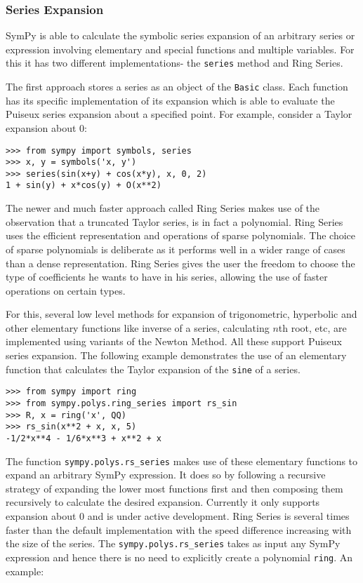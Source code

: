 \subsubsection{Series Expansion}

SymPy is able to calculate the symbolic series expansion of an arbitrary series
or expression involving elementary and special functions and multiple
variables. For this it has two different implementations- the \texttt{series}
method and Ring Series.

The first approach stores a series as an object of the \texttt{Basic} class.
Each function has its specific implementation of its expansion which is able to
evaluate the Puiseux series expansion about a specified point. For example,
consider a Taylor expansion about 0:

\begin{verbatim}
>>> from sympy import symbols, series
>>> x, y = symbols('x, y')
>>> series(sin(x+y) + cos(x*y), x, 0, 2)
1 + sin(y) + x*cos(y) + O(x**2)
\end{verbatim}

The newer and much faster approach called Ring Series makes use of the
observation that a truncated Taylor series, is in fact a polynomial.
Ring Series uses the efficient representation and operations of sparse
polynomials. The choice of sparse polynomials is deliberate as it performs
well in a wider range of cases than a dense representation. Ring Series gives 
the user the freedom to choose the type of coefficients he wants to have in
his series, allowing the use of faster operations on certain types.

For this, several low level methods for expansion of trigonometric, hyperbolic
and other elementary functions like inverse of a series, calculating $n$th
root, etc, are implemented using variants of the Newton\cite{zimmerman} Method.
All these support Puiseux series expansion. The following example demonstrates
the use of an elementary function that calculates the Taylor expansion of the
\texttt{sine} of a series.

\begin{verbatim}
>>> from sympy import ring
>>> from sympy.polys.ring_series import rs_sin
>>> R, x = ring('x', QQ)
>>> rs_sin(x**2 + x, x, 5)
-1/2*x**4 - 1/6*x**3 + x**2 + x
\end{verbatim}

The function \texttt{sympy.polys.rs\_series} makes use of these elementary
functions to expand an arbitrary SymPy expression. It does so by following a
recursive strategy of expanding the lower most functions first and then
composing them recursively to calculate the desired expansion. Currently it
only supports expansion about 0 and is under active development. Ring Series
is several times faster than the default implementation with the speed
difference increasing with the size of the series. The
\texttt{sympy.polys.rs\_series} takes as input any SymPy expression and hence
there is no need to explicitly create a polynomial \texttt{ring}. An example:

